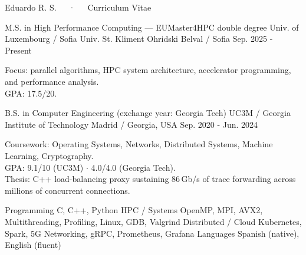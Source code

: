 \documentclass[11pt, a4paper]{cv}
\begin{document}
\makecvheader
\makecvfooter
  {\monthname[\the\month] \the\year}
  {Eduardo R. S.~~~·~~~Curriculum Vitae}
  {\thepage}

\begin{cventries}
  \cventry
  {M.S. in High Performance Computing --- EUMaster4HPC double degree} %
  {Univ. of Luxembourg / Sofia Univ. St. Kliment Ohridski} %
  {Belval / Sofia} %
  {Sep. 2025 - Present} %
  {
    \begin{cvitems}
      \item {Focus: parallel algorithms, HPC system architecture, accelerator programming, and performance analysis. \\ GPA: 17.5/20.}
    \end{cvitems}
  }

  \cventry
  {B.S. in Computer Engineering (exchange year: Georgia Tech)} %
  {UC3M / Georgia Institute of Technology} %
  {Madrid / Georgia, USA} %
  {Sep. 2020 - Jun. 2024} %
  {
    \begin{cvitems}
      \item {Coursework: Operating Systems, Networks, Distributed Systems, Machine Learning, Cryptography. \\ GPA: 9.1/10 (UC3M) $\cdot$ 4.0/4.0 (Georgia Tech). \\ Thesis: C++ load-balancing proxy sustaining 86\,Gb/s of trace forwarding across millions of concurrent connections.}
    \end{cvitems}
  }
\end{cventries}

\begin{cvskills}
  \cvskill
    {Programming}
    {C, C++, Python}
  \cvskill
    {HPC / Systems}
    {OpenMP, MPI, AVX2, Multithreading, Profiling, Linux, GDB, Valgrind}
  \cvskill
    {Distributed / Cloud}
    {Kubernetes, Spark, 5G Networking, gRPC, Prometheus, Grafana}
  \cvskill
    {Languages}
    {Spanish (native), English (fluent)}
\end{cvskills}
\end{document}
